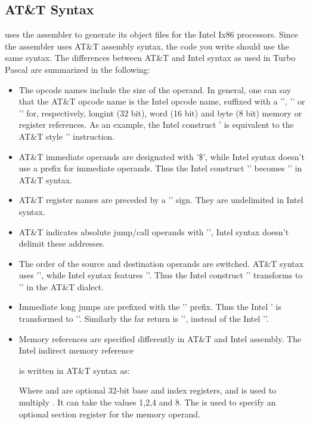 \subsection{AT\&T Syntax}
\label{se:AttSyntax}
\fpc uses the \gnu {} assembler to generate its object files for
the Intel Ix86 processors. Since
the \gnu assembler uses AT\&T assembly syntax, the code you write should
use the same syntax. The differences between AT\&T and Intel syntax as used
in Turbo Pascal are summarized in the following:
\begin{itemize}
\item The opcode names include the size of the operand. In general, one can
say that the AT\&T opcode name is the Intel opcode name, suffixed with a
'', '' or '' for, respectively, longint (32 bit),
word (16 bit) and byte (8 bit) memory or register references. As an example,
the Intel construct \mbox{'} is equivalent to the AT\&T style '' instruction.
\item AT\&T immediate operands are designated with '\$', while Intel syntax
doesn't use a prefix for immediate operands. Thus the Intel construct
'' becomes '' in AT\&T syntax.
\item AT\&T register names are preceded by a '\var{\%}' sign.
They are undelimited in Intel syntax.
\item AT\&T indicates absolute jump/call operands with '\var{*}', Intel
syntax doesn't delimit these addresses.
\item The order of the source and destination operands are switched. AT\&T
syntax uses '', while Intel syntax features ''. Thus the Intel construct '' transforms to
'' in the AT\&T dialect.
\item Immediate long jumps are prefixed with the '' prefix. Thus the
Intel ' is transformed to ''. Similarly the far return is '', instead of the
Intel ''.
\item Memory references are specified differently in AT\&T and Intel
assembly. The Intel indirect memory reference
\begin{quote}
\end{quote}
is written in AT\&T syntax as:
\begin{quote}
\end{quote}
Where  and  are optional 32-bit base and index
registers, and  is used to multiply . It can take the
values 1,2,4 and 8. The  is used to specify an optional section
register for the memory operand.
\end{itemize}

